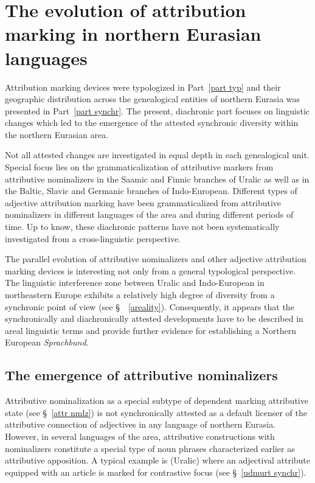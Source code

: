 
\chapter[The evolution of attribution marking]{The evolution of attribution marking in northern Eurasian languages}
Attribution marking devices were typologized in Part~\ref{part typ} and their geographic distribution across the genealogical entities of northern Eurasia was presented in Part~\ref{part synchr}. The present, diachronic part focuses on linguistic changes which led to the emergence of the attested synchronic diversity within the northern Eurasian area.

Not all attested changes are investigated in equal depth in each genealogical unit. Special focus lies on the grammaticalization of attributive markers from attributive nominalizers in the Saamic  and Finnic branches of Uralic as well as in the Baltic, Slavic and Germanic branches of Indo-European. Different types of adjective attribution marking have been grammaticalized from attributive nominalizers in different languages of the area and during different periods of time. Up to know, these diachronic patterns have not been systematically investigated from a cross-linguistic perspective.

The parallel evolution of attributive nominalizers and other adjective attribution marking devices is interesting not only from a general typological perspective. The linguistic interference zone between Uralic and Indo-European in northeastern Europe exhibits a relatively high degree of diversity from a synchronic point of view (see \S~~\ref{areality}). Consequently, it appears that the synchronically and diachronically attested developments have to be described in areal linguistic terms and provide further evidence for establishing a Northern European \textit{Sprachbund}.

\section[Attributive nominalizers]{The emergence of attributive nominalizers}
Attributive nominalization as a special subtype of dependent marking attributive state (see \S~\ref{attr nmlz}) is not synchronically attested as a default licenser of the attributive connection of adjectives in any language of northern Eurasia. However, in several languages of the area, attributive constructions with nominalizers constitute a special type of noun phrases characterized earlier as attributive apposition. A typical example is  (Uralic) where an adjectival attribute equipped with an article is marked for contrastive focus (see \S~\ref{udmurt synchr}).

